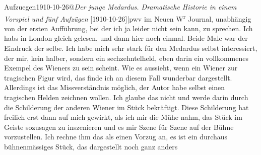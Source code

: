 \begin{ledgroupsized}[t]{13cm}
{                  Aufzuegen1910-10-26@\strich\emph{Der junge Medardus. Dramatische Historie in einem Vorspiel und fünf Aufzügen} {[}1910-10-26{]}|pwv} im Neuen W\textsuperscript{r} Journal, unabhängig von der ersten Aufführung,
               bei der ich ja leider nicht sein kann, zu sprechen.\pend
           \pstart
           Ich habs in London gleich gelesen, und {\pb}dann hier noch einmal. Beide Male war der Eindruck
               der selbe. Ich habe mich sehr stark für den Medardus selbst interessiert, der mir, kein halber, sondern
               ein sechzehntelheld, eben darin ein vollkommenes Exempel des Wieners zu sein scheint. Wie es aussieht, wenn ein
                  Wiener zur tragischen Figur wird, das finde ich
               an diesem Fall wunderbar dargestellt. Allerdings ist das Missverständnis möglich, der
               Autor habe selbst einen tragischen Helden zeichnen wollen. Ich glaube das nicht und
               werde darin durch die Schilderung der anderen Wiener im Stück bekräftigt. Diese Schilderung hat freilich erst dann auf
               mich gewirkt, als ich mir die Mühe nahm, {\pb}das Stück im Geiste sozusagen zu
               inszenieren und es mir Szene für Szene auf der Bühne vorzustellen. Ich rechne ihm das
               als einen Vorzug an, es ist ein durchaus bühnenmässiges Stück, das dargestellt noch ganz anders

\end{ledgroupsized}
